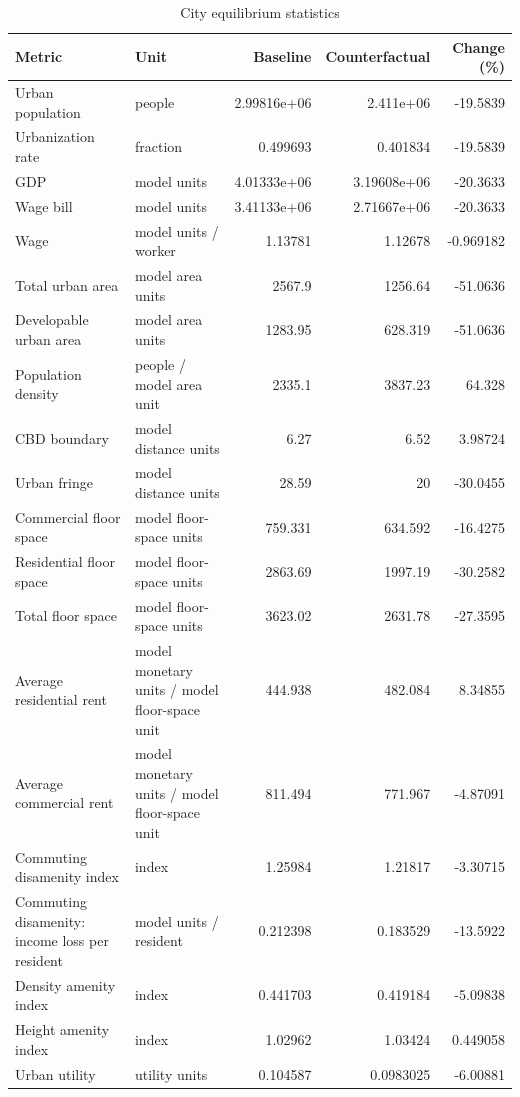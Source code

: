\begin{table}[htbp]
\centering
\caption{City equilibrium statistics}
\small
\begin{tabular}{p{3.9cm}p{2.7cm}rrr}
\toprule
Metric & Unit & Baseline & Counterfactual & Change (\%) \\
\midrule
Urban population & people & 2.99816e+06 & 2.411e+06 & -19.5839 \\
Urbanization rate & fraction & 0.499693 & 0.401834 & -19.5839 \\
GDP & model units & 4.01333e+06 & 3.19608e+06 & -20.3633 \\
Wage bill & model units & 3.41133e+06 & 2.71667e+06 & -20.3633 \\
Wage & model units / worker & 1.13781 & 1.12678 & -0.969182 \\
Total urban area & model area units & 2567.9 & 1256.64 & -51.0636 \\
Developable urban area & model area units & 1283.95 & 628.319 & -51.0636 \\
Population density & people / model area unit & 2335.1 & 3837.23 & 64.328 \\
CBD boundary & model distance units & 6.27 & 6.52 & 3.98724 \\
Urban fringe & model distance units & 28.59 & 20 & -30.0455 \\
Commercial floor space & model floor-space units & 759.331 & 634.592 & -16.4275 \\
Residential floor space & model floor-space units & 2863.69 & 1997.19 & -30.2582 \\
Total floor space & model floor-space units & 3623.02 & 2631.78 & -27.3595 \\
Average residential rent & model monetary units / model floor-space unit & 444.938 & 482.084 & 8.34855 \\
Average commercial rent & model monetary units / model floor-space unit & 811.494 & 771.967 & -4.87091 \\
Commuting disamenity index & index & 1.25984 & 1.21817 & -3.30715 \\
Commuting disamenity: income loss per resident & model units / resident & 0.212398 & 0.183529 & -13.5922 \\
Density amenity index & index & 0.441703 & 0.419184 & -5.09838 \\
Height amenity index & index & 1.02962 & 1.03424 & 0.449058 \\
Urban utility & utility units & 0.104587 & 0.0983025 & -6.00881 \\

\end{tabular}
\end{table}
